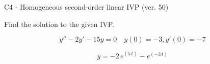 \begin{exercise}
  \begin{exerciseTitle}C4 - Homogeneous second-order linear IVP (ver. 50)\end{exerciseTitle}
  \begin{exerciseStatement}
    
Find the solution to the given IVP.

    
\[y''-2y'-15y = 0 \hspace{1em} y(0) = -3 , y'(0) = -7\]

  \end{exerciseStatement}
  \begin{exerciseAnswer}
    
\[y= -2 \, e^{\left(5 \, t\right)} - e^{\left(-3 \, t\right)}\]

  \end{exerciseAnswer}
\end{exercise}